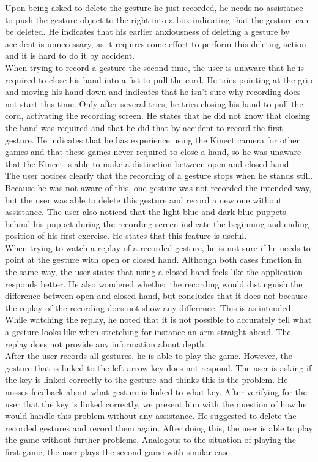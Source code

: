 Upon being asked to delete the gesture he just recorded, he needs no assistance to push the gesture object to the right into a box indicating that the gesture can be deleted. He indicates that his earlier anxiousness of deleting a gesture by accident is unnecessary, as it requires some effort to perform this deleting action and it is hard to do it by accident.\\

When trying to record a gesture the second time, the user is unaware that he is required to close his hand into a fist to pull the cord. He tries pointing at the grip and moving his hand down and indicates that he isn't sure why recording does not start this time. Only after several tries, he tries closing his hand to pull the cord, activating the recording screen. He states that he did not know that closing the hand was required and that he did that by accident to record the first gesture. He indicates that he has experience using the Kinect camera for other games and that these games never required to close a hand, so he was unaware that the Kinect is able to make a distinction between open and closed hand.\\

The user notices clearly that the recording of a gesture stops when he stands still. Because he was not aware of this, one gesture was not recorded the intended way, but the user was able to delete this gesture and record a new one without assistance. The user also noticed that the light blue and dark blue puppets behind his puppet during the recording screen indicate the beginning and ending position of his first exercise. He states that this feature is useful.\\

When trying to watch a replay of a recorded gesture, he is not sure if he needs to point at the gesture with open or closed hand. Although both cases function in the same way, the user states that using a closed hand feels like the application responds better. He also wondered whether the recording would distinguish the difference between open and closed hand, but concludes that it does not because the replay of the recording does not show any difference. This is as intended. While watching the replay, he noted that it is not possible to accurately tell what a gesture looks like when stretching for instance an arm straight ahead. The replay does not provide any information about depth.\\

After the user records all gestures, he is able to play the game. However, the gesture that is linked to the left arrow key does not respond. The user is asking if the key is linked correctly to the gesture and thinks this is the problem. He misses feedback about what gesture is linked to what key. After verifying for the user that the key is linked correctly, we present him with the question of how he would handle this problem without any assistance. He suggested to delete the recorded gestures and record them again. After doing this, the user is able to play the game without further problems. Analogous to the situation of playing the first game, the user plays the second game with similar ease.\\

